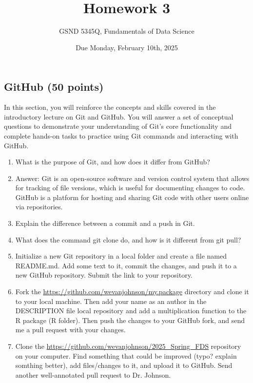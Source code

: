 \documentclass[
]{article}
\title{Homework 3}
\author{GSND 5345Q, Fundamentals of Data Science}
\date{Due Monday, February 10th, 2025}
\begin{document}
\maketitle

\subsection*{GitHub (50 points)}

In this section, you will reinforce the concepts and skills covered in
the introductory lecture on Git and GitHub. You will answer a set of
conceptual questions to demonstrate your understanding of Git's core
functionality and complete hands-on tasks to practice using Git commands
and interacting with GitHub.

\begin{enumerate}

  \item What is the purpose of Git, and how does it differ from GitHub?

  \item Answer: Git is an open-source software and version control system that allows for tracking of file versions, which is useful for documenting changes to code. GitHub is a platform for hosting and sharing Git code with other users online via repositories.

  \item Explain the difference between a commit and a push in Git.
  \item What does the command git clone do, and how is it different from git pull?
  \item Initialize a new Git repository in a local folder and create a file named README.md. Add some text to it, commit the changes, and push it to a new GitHub repository. Submit the link to your repository.
        \item Fork the \href{https://github.com/wevanjohnson/my.package}{https://github.com/wevanjohnson/my.package} directory and clone it to your local machine. Then add your name as an author in the DESCRIPTION file local repository and add a multiplication function to the R package (R folder). Then push the changes to your GitHub fork, and send me a pull request with your changes.  
        \item Clone the \href{https://github.com/wevanjohnson/2025\_Spring\_FDS}{https://github.com/wevanjohnson/2025\_Spring\_FDS} repository on your computer. Find something that could be improved (typo? explain somthing better), add files/changes to it, and upload it to GitHub. Send another well-annotated pull request to Dr. Johnson. 
    \end{enumerate}
\end{document}
